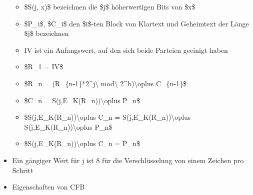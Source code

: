 \documentclass[a4paper]{article}
\begin{document}
\begin{multicols}{3}
\begin{itemize}
              \begin{itemize}
                  \item
                        \$S(j, x)\$ bezeichnen die \$j\$ höherwertigen Bits von \$x\$
                  \item
                        \$P\_i\$, \$C\_i\$ den \$i\$-ten Block von Klartext und Geheimtext
                        der Länge \$j\$ bezeichnen
                  \item
                        IV ist ein Anfangswert, auf den sich beide Parteien geeinigt haben
                  \item
                        \$R\_1 = IV\$
                  \item
                        \$R\_n = (R\_\{n-1\}*2\^{}j\textbackslash{} mod\textbackslash{}
                        2\^{}b)\textbackslash oplus C\_\{n-1\}\$
                  \item
                        \$C\_n = S(j,E\_K(R\_n))\textbackslash oplus P\_n\$
                  \item
                        \$S(j,E\_K(R\_n))\textbackslash oplus C\_n =
                        S(j,E\_K(R\_n))\textbackslash oplus
                        S(j,E\_K(R\_n))\textbackslash oplus P\_n\$
                  \item
                        \$S(j,E\_K(R\_n))\textbackslash oplus C\_n = P\_n\$
              \end{itemize}
        \item
              Ein gängiger Wert für j ist 8 für die Verschlüsselung von einem
              Zeichen pro Schritt
        \item
              Eigenschaften von CFB


\end{itemize}
\end{multicols}
\end{document}
